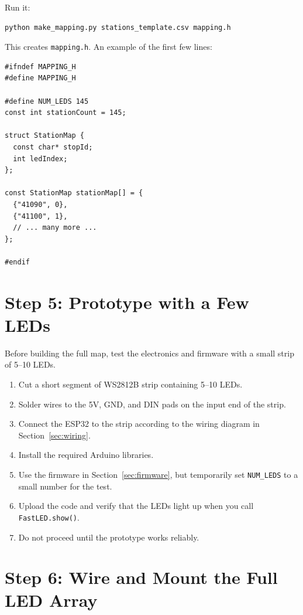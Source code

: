 \documentclass[11pt]{article}
\begin{document}
Run it:

\begin{verbatim}
python make_mapping.py stations_template.csv mapping.h
\end{verbatim}

This creates \texttt{mapping.h}. An example of the first few lines:

\begin{lstlisting}[style=arduino,caption={Example generated mapping.h (fragment).},label={lst:mapping_example}]
#ifndef MAPPING_H
#define MAPPING_H

#define NUM_LEDS 145
const int stationCount = 145;

struct StationMap {
  const char* stopId;
  int ledIndex;
};

const StationMap stationMap[] = {
  {"41090", 0},
  {"41100", 1},
  // ... many more ...
};

#endif
\end{lstlisting}

\section{Step 5: Prototype with a Few LEDs}

Before building the full map, test the electronics and firmware with a small strip of 5--10 LEDs.

\begin{enumerate}
    \item Cut a short segment of WS2812B strip containing 5--10 LEDs.
    \item Solder wires to the 5V, GND, and DIN pads on the input end of the strip.
    \item Connect the ESP32 to the strip according to the wiring diagram in Section~\ref{sec:wiring}.
    \item Install the required Arduino libraries.
    \item Use the firmware in Section~\ref{sec:firmware}, but temporarily set \texttt{NUM\_LEDS} to a small number for the test.
    \item Upload the code and verify that the LEDs light up when you call \texttt{FastLED.show()}.
    \item Do not proceed until the prototype works reliably.
\end{enumerate}

\section{Step 6: Wire and Mount the Full LED Array}
\end{document}
